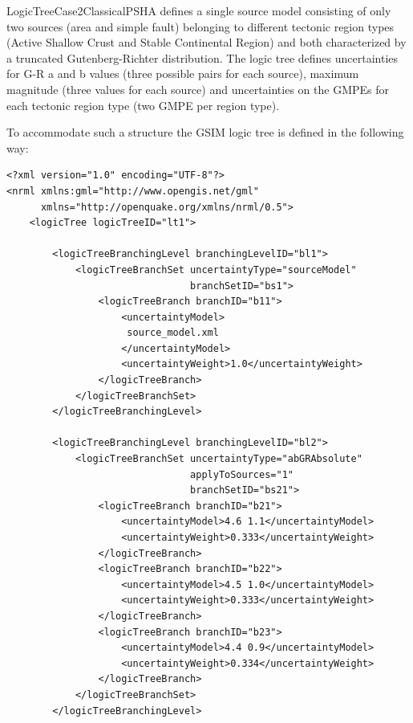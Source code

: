 LogicTreeCase2ClassicalPSHA defines a single source model consisting of only
two sources (area and simple fault) belonging to different tectonic region
types (Active Shallow Crust and Stable Continental Region) and both
characterized by a truncated Gutenberg-Richter distribution. The logic tree
defines uncertainties for G-R a and b values (three possible pairs for each
source), maximum magnitude (three values for each source) and uncertainties
on the GMPEs for each tectonic region type (two GMPE per region type).

To accommodate such a structure the GSIM logic tree is defined in the
following way:

\begin{Verbatim}[frame=single, commandchars=\\\{\}, fontsize=\normalsize]
<?xml version="1.0" encoding="UTF-8"?>
<nrml xmlns:gml="http://www.opengis.net/gml"
      xmlns="http://openquake.org/xmlns/nrml/0.5">
    <logicTree logicTreeID="lt1">

        <logicTreeBranchingLevel branchingLevelID="bl1">
            <logicTreeBranchSet uncertaintyType="sourceModel"
                                branchSetID="bs1">
                <logicTreeBranch branchID="b11">
                    <uncertaintyModel>
                     source_model.xml
                    </uncertaintyModel>
                    <uncertaintyWeight>1.0</uncertaintyWeight>
                </logicTreeBranch>
            </logicTreeBranchSet>
        </logicTreeBranchingLevel>

        <logicTreeBranchingLevel branchingLevelID="bl2">
            <logicTreeBranchSet uncertaintyType="abGRAbsolute"
                                applyToSources="1"
                                branchSetID="bs21">
                <logicTreeBranch branchID="b21">
                    <uncertaintyModel>4.6 1.1</uncertaintyModel>
                    <uncertaintyWeight>0.333</uncertaintyWeight>
                </logicTreeBranch>
                <logicTreeBranch branchID="b22">
                    <uncertaintyModel>4.5 1.0</uncertaintyModel>
                    <uncertaintyWeight>0.333</uncertaintyWeight>
                </logicTreeBranch>
                <logicTreeBranch branchID="b23">
                    <uncertaintyModel>4.4 0.9</uncertaintyModel>
                    <uncertaintyWeight>0.334</uncertaintyWeight>
                </logicTreeBranch>
            </logicTreeBranchSet>
        </logicTreeBranchingLevel>


\end{Verbatim}
